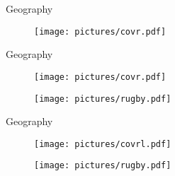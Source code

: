 \documentclass{beamer}
\begin{document}
\begin{frame}{Geography}
  \begin{figure}
  
     \begin{center}
	 \texttt{[image: pictures/covr.pdf]}
	 
  
    \end{center}

    
  \end{figure}

\end{frame}
\begin{frame}{Geography}
  \begin{figure}
  \begin{minipage}[b]{0.8\linewidth}
     \begin{center}
	 \texttt{[image: pictures/covr.pdf]}
	 
  
    \end{center}

    
  \end{minipage} 
  \end{figure}
  
  \begin{figure}
  \begin{minipage}[b]{0.5\linewidth}
     \begin{center}
	 \texttt{[image: pictures/rugby.pdf]}
  
    \end{center}

    
  \end{minipage}
   \end{figure}

  \end{frame}
\begin{frame}{Geography}
  \begin{figure}
  \begin{minipage}[b]{0.8\linewidth}
     \begin{center}
	 \texttt{[image: pictures/covrl.pdf]}
	 
  
    \end{center}

    
  \end{minipage} 
  \end{figure}
  
  \begin{figure}
  \begin{minipage}[b]{0.5\linewidth}
     \begin{center}
	 \texttt{[image: pictures/rugby.pdf]}
  
    \end{center}

    
  \end{minipage}
   \end{figure}

  \end{frame}
 
\end{document}
